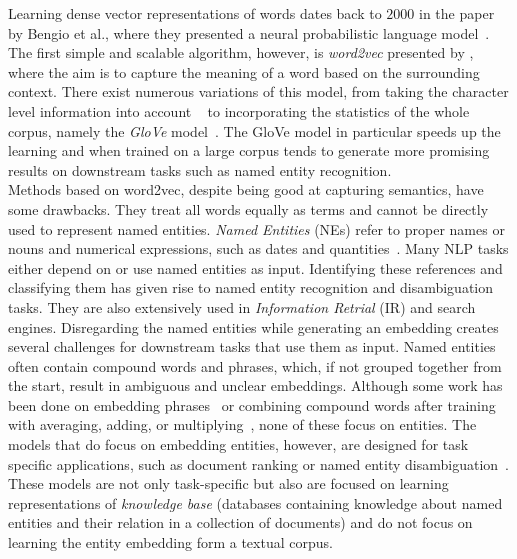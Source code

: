 Learning dense vector representations of words dates back to $2000$ in the paper by Bengio et al., where they presented a neural probabilistic language model~. The first simple and scalable algorithm, however, is \emph{word2vec} presented by , where the aim is to capture the meaning of a word based on the surrounding context. There exist numerous variations of this model, from taking the character level information into account ~ to incorporating the statistics of the whole corpus, namely the \emph{GloVe} model~. The GloVe model in particular speeds up the learning and when trained on a large corpus tends to generate more promising results on downstream tasks such as named entity recognition.\\
Methods based on word2vec, despite being good at capturing semantics, have some drawbacks. They treat all words equally as terms and cannot be directly used to represent named entities. \emph{Named Entities} (NEs) refer to proper names or nouns and numerical expressions, such as dates and quantities~.
Many NLP tasks either depend on or use named entities as input. Identifying these references and classifying them has given rise to named entity recognition and disambiguation tasks. They are also extensively used in \emph{Information Retrial} (IR) and search engines. Disregarding the named entities while generating an embedding creates several challenges for downstream tasks that use them as input. Named entities often contain compound words and phrases, which, if not grouped together from the start, result in ambiguous and unclear embeddings. Although some work has been done on embedding phrases~ or combining compound words after training with averaging, adding, or multiplying~, none of these focus on entities. The models that do focus on embedding entities, however, are designed for task specific applications, such as document ranking or named entity disambiguation~. These models are not only task-specific but also are focused on learning representations of \emph{knowledge base} (databases containing knowledge about named entities and their relation in a collection of documents) and do not focus on learning the entity embedding form a textual corpus.\\
